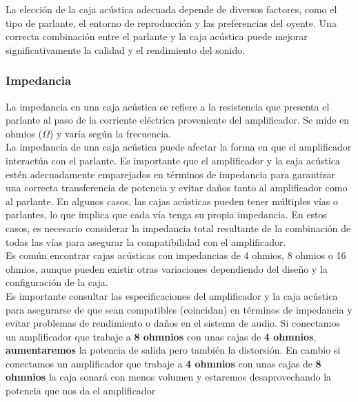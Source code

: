 \documentclass[
	12pt, %
	fleqn, %
	a4paper, %
	oneside, %
]{LegrandOrangeBook}
\begin{document}
La elección de la caja acústica adecuada depende de diversos factores, como el tipo de parlante, el entorno de reproducción y las preferencias del oyente. Una correcta combinación entre el parlante y la caja acústica puede mejorar significativamente la calidad y el rendimiento del sonido.

\subsubsection{Impedancia}

La impedancia en una caja acústica se refiere a la resistencia que presenta el parlante al paso de la corriente eléctrica proveniente del amplificador. Se mide en ohmios ($\Omega$) y varía según la frecuencia.\\
La impedancia de una caja acústica puede afectar la forma en que el amplificador interactúa con el parlante. Es importante que el amplificador y la caja acústica estén adecuadamente emparejados en términos de impedancia para garantizar una correcta transferencia de potencia y evitar daños tanto al amplificador como al parlante.
En algunos casos, las cajas acústicas pueden tener múltiples vías o parlantes, lo que implica que cada vía tenga su propia impedancia. En estos casos, es necesario considerar la impedancia total resultante de la combinación de todas las vías para asegurar la compatibilidad con el amplificador.\\
Es común encontrar cajas acústicas con impedancias de 4 ohmios, 8 ohmios o 16 ohmios, aunque pueden existir otras variaciones dependiendo del diseño y la configuración de la caja.\\
Es importante consultar las especificaciones del amplificador y la caja acústica para asegurarse de que sean compatibles (coincidan) en términos de impedancia y evitar problemas de rendimiento o daños en el sistema de audio. Si conectamos un amplificador que  trabaje a \textbf{8 ohmnios} con unas cajas de \textbf{4 ohmnios}, \textbf{aumentaremos} la potencia de salida pero también la distorsión. 
En cambio si conectamos un amplificador que trabaje a \textbf{4 ohmnios} con unas cajas de \textbf{8 ohmnios} la caja sonará con menos volumen y estaremos desaprovechando la potencia que nos da el amplificador
\end{document}
